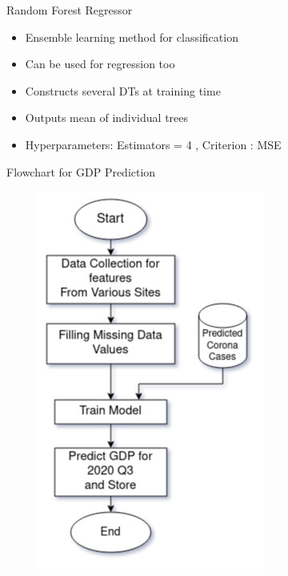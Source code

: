 \documentclass[11pt]{beamer}
\begin{document}
\begin{frame}{Random Forest Regressor}
\begin{itemize}
\item Ensemble learning method for classification
\item Can be used for regression too
\item Constructs several DTs at training time
\item Outputs mean of individual trees
\item Hyperparameters: Estimators = 4 , Criterion : MSE
\end{itemize}
\end{frame}



\begin{frame}{Flowchart for GDP Prediction}
\begin{figure}
\includegraphics[scale=0.4]{ml_image_io.jpg}

\end{figure}
\end{frame}
\end{document}
